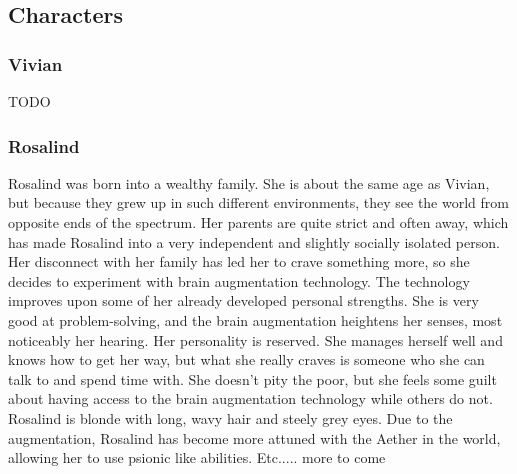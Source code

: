 \documentclass[12pt,titlepage]{article}
\newcommand\tab[1][.5in]{\hspace*{#1}}
\begin{document}





\subsection{Characters}

\subsubsection{Vivian}
TODO

\subsubsection{Rosalind}
\tab Rosalind was born into a wealthy family. She is about the same age as Vivian, 
but because they grew up in such different environments, they see the world from 
opposite ends of the spectrum. Her parents are quite strict and often away, which 
has made Rosalind into a very independent and slightly socially isolated person. 
Her disconnect with her family has led her to crave something more, so she 
decides to experiment with brain augmentation technology. The technology 
improves upon some of her already developed personal strengths. She is very 
good at problem-solving, and the brain augmentation heightens her senses, most 
noticeably her hearing. Her personality is reserved. She manages herself well and 
knows how to get her way, but what she really craves is someone who she can 
talk to and spend time with. She doesn't pity the poor, but she feels some guilt 
about having access to the brain augmentation technology while others do not. 
Rosalind is blonde with long, wavy hair and steely grey eyes. Due to the 
augmentation, Rosalind has become more attuned with the Aether in the world, 
allowing her to use psionic like abilities. Etc..... more to come
\end{document}

